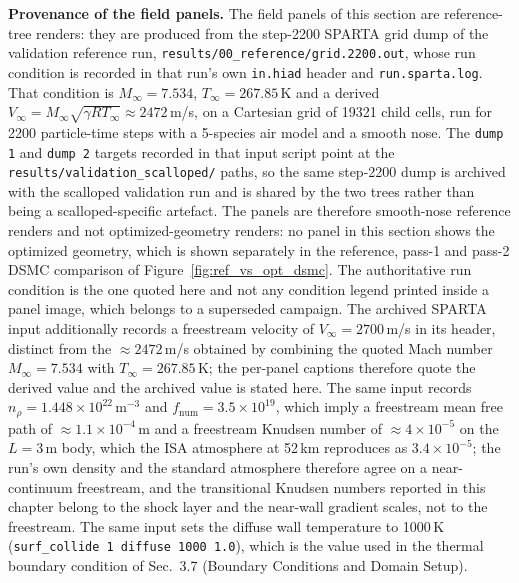 \textbf{Provenance of the field panels.}
The field panels of this section are reference-tree renders: they are produced from the step-2200 SPARTA grid dump of the validation reference run, \texttt{results/00\_reference/grid.2200.out}, whose run condition is recorded in that run's own \texttt{in.hiad} header and \texttt{run.sparta.log}. That condition is $M_{\infty} = 7.534$, $T_{\infty} = 267.85$\,K and a derived $V_{\infty} = M_{\infty}\sqrt{\gamma R T_{\infty}} \approx 2472$\,m/s, on a Cartesian grid of 19321 child cells, run for 2200 particle-time steps with a 5-species air model and a smooth nose. The \texttt{dump 1} and \texttt{dump 2} targets recorded in that input script point at the \texttt{results/validation\_scalloped/} paths, so the same step-2200 dump is archived with the scalloped validation run and is shared by the two trees rather than being a scalloped-specific artefact. The panels are therefore smooth-nose reference renders and not optimized-geometry renders: no panel in this section shows the optimized geometry, which is shown separately in the reference, pass-1 and pass-2 DSMC comparison of Figure~\ref{fig:ref_vs_opt_dsmc}. The authoritative run condition is the one quoted here and not any condition legend printed inside a panel image, which belongs to a superseded campaign. The archived SPARTA input additionally records a freestream velocity of $V_{\infty}=2700$\,m/s in its header, distinct from the $\approx2472$\,m/s obtained by combining the quoted Mach number $M_{\infty}=7.534$ with $T_{\infty}=267.85$\,K; the per-panel captions therefore quote the derived value and the archived value is stated here. The same input records $n_{\rho}=1.448\times10^{22}$\,m$^{-3}$ and $f_{\mathrm{num}}=3.5\times10^{19}$, which imply a freestream mean free path of $\approx1.1\times10^{-4}$\,m and a freestream Knudsen number of $\approx4\times10^{-5}$ on the $L=3$\,m body, which the ISA atmosphere at 52\,km reproduces as $3.4\times10^{-5}$; the run's own density and the standard atmosphere therefore agree on a near-continuum freestream, and the transitional Knudsen numbers reported in this chapter belong to the shock layer and the near-wall gradient scales, not to the freestream. The same input sets the diffuse wall temperature to 1000\,K (\texttt{surf\_collide 1 diffuse 1000 1.0}), which is the value used in the thermal boundary condition of Sec.~3.7 (Boundary Conditions and Domain Setup).

